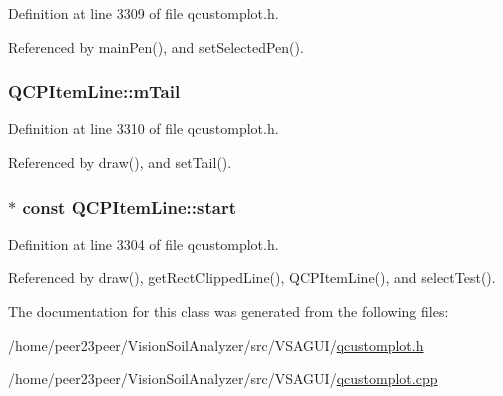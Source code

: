 Definition at line 3309 of file qcustomplot.\+h.



Referenced by main\+Pen(), and set\+Selected\+Pen().

\hypertarget{class_q_c_p_item_line_ab8ed61dfe15bbb1cbf9b95eae95e242f}{}
\subsubsection[{m\+Tail}]{ Q\+C\+P\+Item\+Line\+::m\+Tail\hspace{0.3cm}{\ttfamily [protected]}}\label{class_q_c_p_item_line_ab8ed61dfe15bbb1cbf9b95eae95e242f}


Definition at line 3310 of file qcustomplot.\+h.



Referenced by draw(), and set\+Tail().

\hypertarget{class_q_c_p_item_line_a602da607a09498b0f152ada1d6851bc5}{}
\subsubsection[{start}]{$\ast$ const Q\+C\+P\+Item\+Line\+::start}\label{class_q_c_p_item_line_a602da607a09498b0f152ada1d6851bc5}


Definition at line 3304 of file qcustomplot.\+h.



Referenced by draw(), get\+Rect\+Clipped\+Line(), Q\+C\+P\+Item\+Line(), and select\+Test().



The documentation for this class was generated from the following files\+:\begin{DoxyCompactItemize}
\item 
/home/peer23peer/\+Vision\+Soil\+Analyzer/src/\+V\+S\+A\+G\+U\+I/\hyperlink{qcustomplot_8h}{qcustomplot.\+h}\item 
/home/peer23peer/\+Vision\+Soil\+Analyzer/src/\+V\+S\+A\+G\+U\+I/\hyperlink{qcustomplot_8cpp}{qcustomplot.\+cpp}\end{DoxyCompactItemize}
